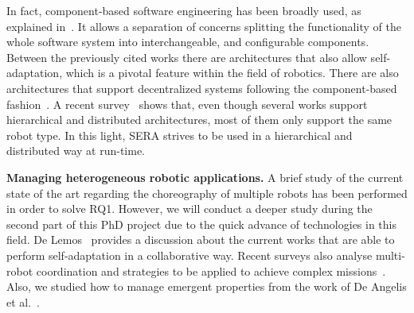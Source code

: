 In fact, component-based software engineering has been broadly used, as explained in~\cite{Brugali2009}. 
It allows a separation of concerns splitting the functionality of the whole software system into interchangeable, and configurable components. 
Between the previously cited works there are architectures that also allow self-adaptation, which is a pivotal feature within the field of robotics.
There are also architectures that support decentralized systems following the component-based fashion~\cite{Lesire2016}.
A recent survey~\cite{Yan2013} shows that, even though several works support hierarchical and distributed architectures, most of them only support the same robot type. 
In this light, SERA strives to be used in a hierarchical and distributed way at run-time.

\textbf{Managing heterogeneous robotic applications.}
A brief study of the current state of the art regarding the choreography of multiple robots has been performed in order to solve RQ1.
However, we will conduct a deeper study during the second part of this PhD project due to the quick advance of technologies in this field.
De Lemos~\cite{DeLemos2013} provides a discussion about the current works that are able to perform self-adaptation in a collaborative way.
Recent surveys also analyse multi-robot coordination and strategies to be applied to achieve complex missions~\cite{Yan2013}.
Also, we studied how to manage emergent properties from the work of De Angelis et al.~\cite{DeAngelis2016}.
